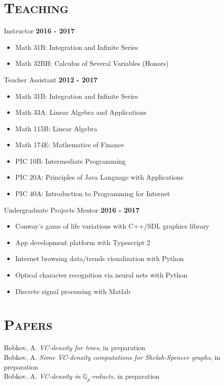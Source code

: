 \documentclass[margin, 10pt]{res} %
\begin{document}
\begin{resume}
\section{\textsc{Teaching}}
Instructor \hfill \textbf{2016 - 2017} 
  \begin{itemize}
  \item Math 31B: Integration and Infinite Series 
  \item Math 32BH: Calculus of Several Variables (Honors) 
  \end{itemize}
Teacher Assistant \hfill \textbf{2012 - 2017} 
  \begin{itemize}
  \item Math 31B: Integration and Infinite Series %
  \item Math 33A: Linear Algebra and Applications %
  \item Math 115B: Linear Algebra %
  \item Math 174E: Mathematics of Finance %
  \item PIC 10B: Intermediate Programming %
  \item PIC 20A: Principles of Java Language with Applications %
  \item PIC 40A: Introduction to Programming for Internet %
  \end{itemize}
Undergraduate Projects Mentor \hfill \textbf{2016 - 2017} 
  \begin{itemize}
  \item Conway's game of life variations with C++/SDL graphics library %
  \item App development platform with Typescript 2 %
  \item Internet browsing data/trends visualization with Python %
  \item Optical character recognition via neural nets with Python %
  \item Discrete signal processing with Matlab %
  \end{itemize}




 
\section{\textsc{Papers}}

Bobkov, A. {\it VC-density for trees}, in preparation  \\
Bobkov, A. {\it Some VC-density computations for Shelah-Spencer graphs}, in preparation \\
Bobkov, A. {\it VC-density in $\mathbb{Q}_p$-reducts}, in preparation


\end{resume}
\end{document}
